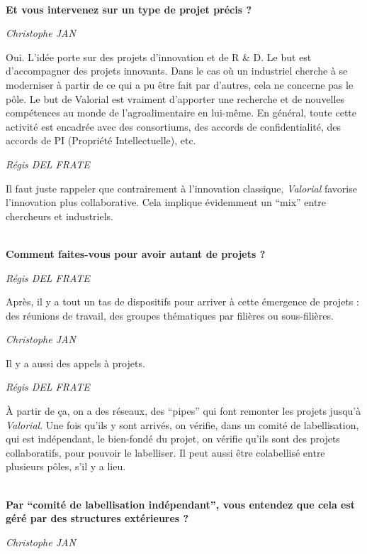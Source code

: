 \documentclass[a4paper,12pt]{report}
\begin{document}
	\textbf{\\Et vous intervenez sur un type de projet précis ?}

	\emph{Christophe JAN }
  
    Oui. L’idée porte sur des projets d’innovation et de R \& D. Le but est d’accompagner des projets innovants. Dans le cas où un industriel cherche à se moderniser à partir de ce qui a pu être fait par d’autres, cela ne concerne pas le pôle. Le but de Valorial est vraiment d’apporter une recherche et de nouvelles compétences au monde de l’agroalimentaire en lui-même. En général, toute cette activité est encadrée avec des consortiums, des accords de confidentialité, des accords de PI (Propriété Intellectuelle), etc. 

	\emph{Régis DEL FRATE}
 
    Il faut juste rappeler que contrairement à l’innovation classique, \textit{Valorial} favorise l’innovation plus collaborative. Cela implique évidemment un “mix” entre chercheurs et industriels. 

	\textbf{\\Comment faites-vous pour avoir autant de projets ?}

	\emph{Régis DEL FRATE}
	
    Après, il y a tout un tas de dispositifs pour arriver à cette émergence de projets : des réunions de travail, des groupes thématiques par filières ou sous-filières.

	\emph{Christophe JAN}

    Il y a aussi des appels à projets.

	\emph{Régis DEL FRATE}

    À partir de ça, on a des réseaux, des “pipes” qui font remonter les projets jusqu’à \textit{Valorial}. Une fois qu’ils y sont arrivés, on vérifie, dans un comité de labellisation, qui est indépendant, le bien-fondé du projet, on vérifie qu’ils sont des projets collaboratifs, pour pouvoir le labelliser. Il peut aussi être colabellisé entre plusieurs pôles, s’il y a lieu.

	\textbf{\\Par “comité de labellisation indépendant”, vous entendez que cela est géré par des structures extérieures ?}

	\emph{Christophe JAN}
\end{document}

